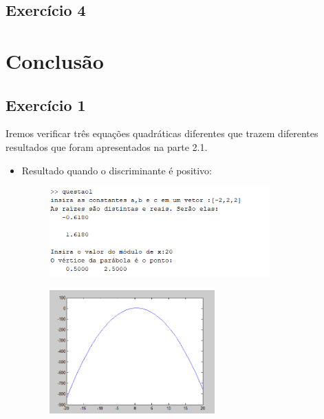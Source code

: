 \documentclass[12pt]{article}
\begin{document}
\subsection{Exercício 4}

\pagebreak
\section{Conclusão}

\subsection{Exercício 1}

Iremos verificar três equações quadráticas diferentes que trazem diferentes resultados que foram apresentados na parte 2.1.

\begin{itemize}
    \item Resultado quando o discriminante é positivo:
    
    \begin{figure}[H]
        \begin{center}
            \includegraphics[width=0.8\textwidth]{outputq1-3.png}
        \end{center}
    \end{figure}
    \begin{figure}[H]
        \begin{center}
            \includegraphics[width=0.6\textwidth]{graficoq1-3.png}
        \end{center}
    \end{figure}


\end{itemize}
\end{document}
